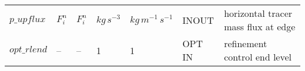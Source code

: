 \begin{landscape}
\begin{singlespacing}
\begin{longtable}{p{2.9cm}|x{2.9cm}|x{2.9cm}|x{1.9cm}|x{1.9cm}|x{1.7cm}|p{7.3cm}}
$p\_upflux$             &  $F^{n}_{i}$                  &  $F^{n}_{i}$              &  $kg\,s^{-3}$          &  $kg\,m^{-1}\,s^{-1}$  &  INOUT     &  horizontal tracer mass flux at edge \\
$opt\_rlend$            &  --                           &  --                       &  1                     &  1                     &  OPT IN    &  refinement control end level \\

\end{longtable}
\endgroup

\end{singlespacing}

\end{landscape}
\normalsize 